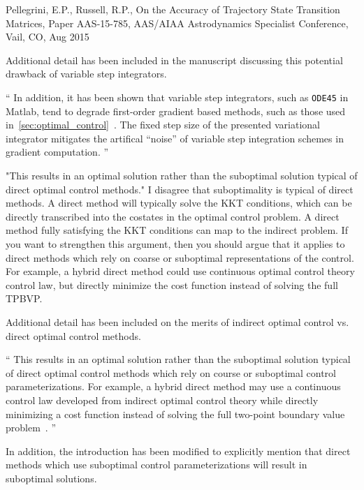 \documentclass[11pt]{article}
\newenvironment{correction}{\begin{list}{}{\setlength{\leftmargin}{1cm}\setlength{\rightmargin}{1cm}}\vspace{\parsep}\item[]``}{''\end{list}}
\begin{document}
\begin{enumerate}
\begin{itshape}
Pellegrini, E.P., Russell, R.P., On the Accuracy of Trajectory State Transition Matrices, Paper AAS-15-785, AAS/AIAA Astrodynamics Specialist Conference, Vail, CO, Aug 2015
\end{itshape}

Additional detail has been included in the manuscript discussing this potential drawback of variable step integrators.
\begin{correction}
In addition, it has been shown that variable step integrators, such as \texttt{ODE45} in Matlab, tend to degrade first-order gradient based methods, such as those used in~\cref{sec:optimal_control}~\cite{pellegrini2016}.
The fixed step size of the presented variational integrator mitigates the artifical ``noise'' of variable step integration schemes in gradient computation.
\end{correction}
\item 
    \begin{itshape}
"This results in an optimal solution rather than the suboptimal solution typical of direct optimal control methods." I disagree that suboptimality is typical of direct methods.  A direct method will typically solve the KKT conditions, which can be directly transcribed into the costates in the optimal control problem.  A direct method fully satisfying the KKT conditions can map to the indirect problem. If you want to strengthen this argument, then you should argue that it applies to direct methods which rely on coarse or suboptimal representations of the control.  For example, a hybrid direct method could use continuous optimal control theory control law, but directly minimize the cost function instead of solving the full TPBVP.  
\end{itshape}

Additional detail has been included on the merits of indirect optimal control vs. direct optimal control methods.
\begin{correction}
This results in an optimal solution rather than the suboptimal solution typical of direct optimal control methods which rely on course or suboptimal control parameterizations.
For example, a hybrid direct method may use a continuous control law developed from indirect optimal control theory while directly minimizing a cost function instead of solving the full two-point boundary value problem~\cite{ozimek2010a}.
\end{correction}

In addition, the introduction has been modified to explicitly mention that direct methods which use suboptimal control parameterizations will result in suboptimal solutions.


\end{enumerate}
\end{document}
